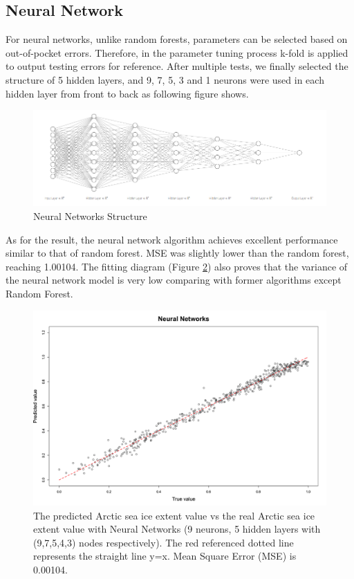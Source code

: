 \subsection{Neural Network} %

For neural networks, unlike random forests, parameters can be selected based on out-of-pocket errors. Therefore, in the parameter tuning process k-fold is applied to output testing errors for reference. After multiple tests, we finally selected the structure of 5 hidden layers, and 9, 7, 5, 3 and 1 neurons were used in each hidden layer from front to back as following figure shows.

\begin{figure}[htbp]
\centering
\includegraphics[width = 1.0\textwidth]{Figure/4.2.5-NN-Structure.png}
\caption{Neural Networks Structure}
\label{4.2.5-NN-Structure}
\end{figure}

As for the result, the neural network algorithm achieves excellent performance similar to that of random forest. MSE was slightly lower than the random forest, reaching 1.00104. The fitting diagram (Figure \ref{4.2.5-NN}) also proves that the variance of the neural network model is very low comparing with former algorithms except Random Forest.

\begin{figure}[htbp]
\centering
\includegraphics[width = 1.0\textwidth]{Figure/4.2.5-NN.png}
\caption{The predicted Arctic sea ice extent value vs the real Arctic sea ice extent value with Neural Networks (9 neurons, 5 hidden layers with (9,7,5,4,3) nodes respectively). The red referenced dotted line represents the straight line y=x. Mean Square Error (MSE) is 0.00104.}
\label{4.2.5-NN}
\end{figure}



